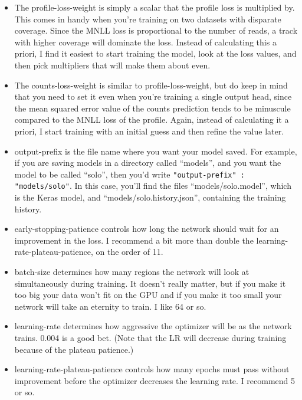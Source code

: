 \documentclass{article}
\begin{document}
\begin{itemize}
    \item The profile-loss-weight is simply a scalar that the profile loss is multiplied by. This comes in handy when you're training on two datasets with disparate coverage. Since the MNLL loss is proportional to the number of reads, a track with higher coverage will dominate the loss. Instead of calculating this a priori, I find it easiest to start training the model, look at the loss values, and then pick multipliers that will make them about even. 
    \item The counts-loss-weight is similar to profile-loss-weight, but do keep in mind that you need to set it even when you're training a single output head, since the mean squared error value of the counts prediction tends to be minuscule compared to the MNLL loss of the profile. Again, instead of calculating it a priori, I start training with an initial guess and then refine the value later. 
    \item output-prefix is the file name where you want your model saved. For example, if you are saving models in a directory called ``models'', and you want the model to be called ``solo'', then you'd write \texttt{"output-prefix" : "models/solo"}. In this case, you'll find the files ``models/solo.model'', which is the Keras model, and ``models/solo.history.json'', containing the training history. 
    \item early-stopping-patience controls how long the network should wait for an improvement in the loss. I recommend a bit more than double the learning-rate-plateau-patience, on the order of 11. 
    \item batch-size determines how many regions the network will look at simultaneously during training. It doesn't really matter, but if you make it too big your data won't fit on the GPU and if you make it too small your network will take an eternity to train. I like 64 or so. 
    \item learning-rate determines how aggressive the optimizer will be as the network trains. 0.004 is a good bet. (Note that the LR will decrease during training because of the plateau patience.)
    \item learning-rate-plateau-patience controls how many epochs must pass without improvement before the optimizer decreases the learning rate. I recommend 5 or so. 


\end{itemize}
\end{document}
